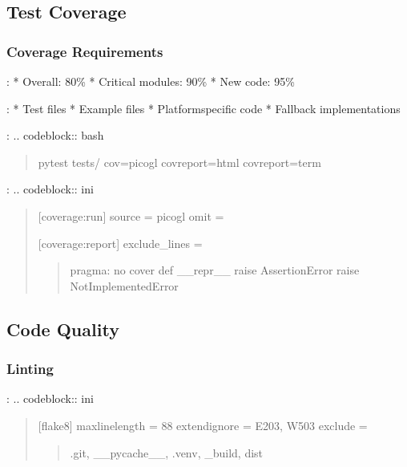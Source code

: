 \documentclass[a4paper,10pt,english,openany,oneside]{sphinxmanual}
\begin{document}
\subsection{Test Coverage}
\label{\detokenize{testing:test-coverage}}

\subsubsection{Coverage Requirements}
\label{\detokenize{testing:coverage-requirements}}
\sphinxAtStartPar
{}:
* Overall: 80\%
* Critical modules: 90\%
* New code: 95\%

\sphinxAtStartPar
{}:
* Test files
* Example files
* Platform\sphinxhyphen{}specific code
* Fallback implementations

\sphinxAtStartPar
{}:
.. code\sphinxhyphen{}block:: bash
\begin{quote}

\sphinxAtStartPar
pytest tests/ \textendash{}cov=picogl \textendash{}cov\sphinxhyphen{}report=html \textendash{}cov\sphinxhyphen{}report=term
\end{quote}

\sphinxAtStartPar
{}:
.. code\sphinxhyphen{}block:: ini
\begin{quote}

\sphinxAtStartPar
{[}coverage:run{]}
source = picogl
omit =
\begin{quote}

\sphinxAtStartPar
{}
\end{quote}

\sphinxAtStartPar
{[}coverage:report{]}
exclude\_lines =
\begin{quote}

\sphinxAtStartPar
pragma: no cover
def \_\_repr\_\_
raise AssertionError
raise NotImplementedError
\end{quote}
\end{quote}


\subsection{Code Quality}
\label{\detokenize{testing:code-quality}}

\subsubsection{Linting}
\label{\detokenize{testing:linting}}
\sphinxAtStartPar
{}:
.. code\sphinxhyphen{}block:: ini
\begin{quote}

\sphinxAtStartPar
{[}flake8{]}
max\sphinxhyphen{}line\sphinxhyphen{}length = 88
extend\sphinxhyphen{}ignore = E203, W503
exclude =
\begin{quote}

\sphinxAtStartPar
.git,
\_\_pycache\_\_,
.venv,
\_build,
dist
\end{quote}
\end{quote}
\end{document}

